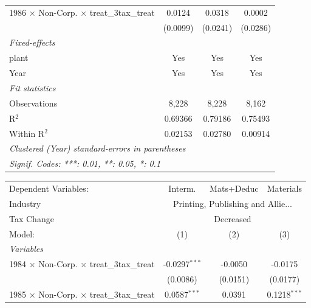 \documentclass[
  12pt]{article}
\theoremstyle{definition}
\theoremstyle{remark}
\begin{document}
\begin{table}
\begin{minipage}{\linewidth}
\begin{tabular}{lccc}
   1986 $\times$ Non-Corp. $\times$ treat\_3tax\_treat     & 0.0124         & 0.0318        & 0.0002\\   
                                                           & (0.0099)       & (0.0241)      & (0.0286)\\   
   \midrule
   \emph{Fixed-effects}\\
   plant                                                   & Yes            & Yes           & Yes\\  
   Year                                                    & Yes            & Yes           & Yes\\  
   \midrule
   \emph{Fit statistics}\\
   Observations                                            & 8,228          & 8,228         & 8,162\\  
   R$^2$                                                   & 0.69366        & 0.79186       & 0.75493\\  
   Within R$^2$                                            & 0.02153        & 0.02780       & 0.00914\\  
   \midrule \midrule
   \multicolumn{4}{l}{\emph{Clustered (Year) standard-errors in parentheses}}\\
   \multicolumn{4}{l}{\emph{Signif. Codes: ***: 0.01, **: 0.05, *: 0.1}}\\
\end{tabular}
\par\endgroup
\begingroup
\centering
\begin{tabular}{lccc}
   \tabularnewline \midrule \midrule
   Dependent Variables:                                    & Interm.         & Mats+Deduc & Materials\\  
   Industry & \multicolumn{3}{c}{Printing, Publishing and Allie...} \\ 
   Tax Change & \multicolumn{3}{c}{Decreased} \\ 
   Model:                                                  & (1)             & (2)        & (3)\\  
   \midrule
   \emph{Variables}\\
   1984 $\times$ Non-Corp. $\times$ treat\_3tax\_treat     & -0.0297$^{***}$ & -0.0050    & -0.0175\\   
                                                           & (0.0086)        & (0.0151)   & (0.0177)\\   
   1985 $\times$ Non-Corp. $\times$ treat\_3tax\_treat     & 0.0587$^{***}$  & 0.0391     & 0.1218$^{***}$\\   

\end{tabular}
\end{minipage}
\end{table}
\end{document}
